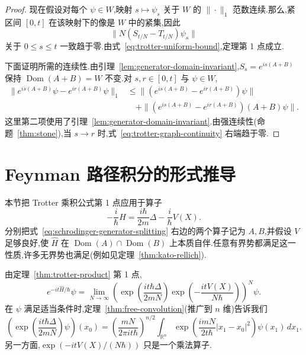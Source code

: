 \begin{proof}
现在假设对每个 $\psi\in W$,映射 $s\mapsto\psi_s$ 关于 $W$ 的 $\|\cdot\|_1$ 范数连续.那么,紧区间 $[0,t]$ 在该映射下的像是 $W$ 中的紧集,因此
\[
 \|N(S_{t/N}-T_{t/N})\psi_s\|
\]
关于 $0\le s\le t$ 一致趋于零.由式~\eqref{eq:trotter-uniform-bound},定理第 1 点成立.

下面证明所需的连续性.由引理~\ref{lem:generator-domain-invariant},$S_s=e^{is(A+B)}$ 保持 $\operatorname{Dom}(A+B)=W$ 不变.对 $s,r\in[0,t]$ 与 $\psi\in W$,
\[
\begin{aligned}
 \|e^{is(A+B)}\psi-e^{ir(A+B)}\psi\|_1
 &\le \|(e^{is(A+B)}-e^{ir(A+B)})\psi\|\\
 &\quad+\|(e^{is(A+B)}-e^{ir(A+B)})(A+B)\psi\|.
\end{aligned}\label{eq:trotter-graph-continuity}
\]
这里第二项使用了引理~\ref{lem:generator-domain-invariant}.由强连续性(命题~\ref{thm:stone}),当 $s\to r$ 时,式~\eqref{eq:trotter-graph-continuity} 右端趋于零.
\end{proof}

\section{Feynman 路径积分的形式推导}
\label{sec:formal-feynman-path-integral}

本节把 Trotter 乘积公式第 1 点应用于算子
\[
 -\frac{i}{\hbar}\widehat H
 =\frac{i\hbar}{2m}\Delta-\frac{i}{\hbar}V(X).\label{eq:schrodinger-generator-splitting}
\]
分别把式~\eqref{eq:schrodinger-generator-splitting} 右边的两个算子记为 $A,B$,并假设 $V$ 足够良好,使 $\widehat H$ 在 $\operatorname{Dom}(A)\cap\operatorname{Dom}(B)$ 上本质自伴.任意有界势都满足这一性质,许多无界势也满足(例如见定理~\ref{thm:kato-rellich}).

由定理~\ref{thm:trotter-product} 第 1 点,
\[
 e^{-it\widehat H/\hbar}\psi
 =\lim_{N\to\infty}
 \left(
 \exp\left(\frac{it\hbar\Delta}{2mN}\right)
 \exp\left(-\frac{itV(X)}{N\hbar}\right)
 \right)^N\psi.
\]
在 $\psi$ 满足适当条件时,定理~\ref{thm:free-convolution}(推广到 $n$ 维)告诉我们
\[
\left(\exp\left(\frac{it\hbar\Delta}{2mN}\right)\psi\right)(x_0)
=\left(\frac{mN}{2\pi i t\hbar}\right)^{n/2}
\int_{\mathbb R^n}
\exp\left(\frac{imN}{2t\hbar}|x_1-x_0|^2\right)\psi(x_1)\,dx_1.
\]
另一方面,$\exp(-itV(X)/(N\hbar))$ 只是一个乘法算子.

